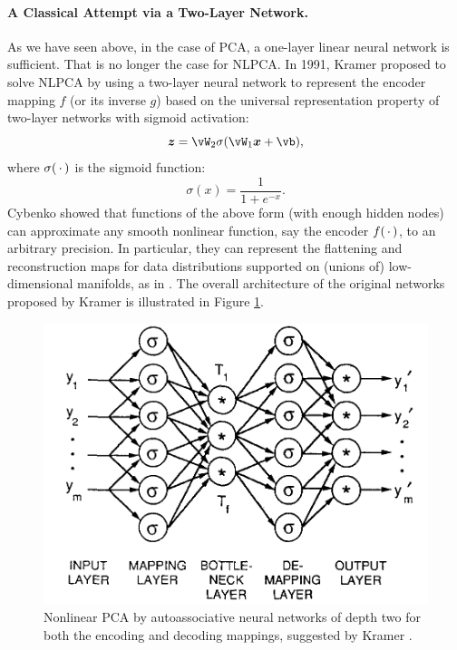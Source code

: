 \documentclass[../../book-main.tex]{subfiles}
\begin{document}
\paragraph{A Classical Attempt via a Two-Layer Network.} As we have
seen above, in the case of PCA, a one-layer linear neural
network is sufficient. That is no longer the case for NLPCA. In 1991, Kramer
\cite{Kramer1991NonlinearPC}  proposed to solve NLPCA by using a two-layer
neural network to represent the encoder mapping $f$ (or its inverse $g$) based
on the universal representation property of two-layer networks with sigmoid
activation:
\begin{equation}
  \z = \vW_2 \sigma(\vW_1\x +\vb),
\end{equation}
where $\sigma(\,\cdot\,)$ is the sigmoid function:
\begin{equation}
  \sigma(x) = \frac{1}{1+ e^{-x}}.
\end{equation}
Cybenko \cite{Cybenko1989ApproximationBS} showed that functions of
the above form (with enough hidden nodes) can approximate any smooth
nonlinear function, say the encoder $f(\,\cdot\,)$, to an arbitrary
precision. In particular, they can represent the flattening and reconstruction
maps for data distributions supported on (unions of) low-dimensional manifolds,
as in . The overall architecture of the
original networks proposed by Kramer is illustrated in Figure \ref{fig:NLPCA}.
\begin{figure}[tb]
  \centering
  \includegraphics[width=0.6\linewidth]{chapters/chapter5/figs/kramer1991nonlinearPCA.png}
  \caption{Nonlinear PCA by  autoassociative neural networks of depth
    two for both the encoding and decoding mappings, suggested by
  Kramer \cite{Kramer1991NonlinearPC}.}
  \label{fig:NLPCA}
\end{figure}
\end{document}
